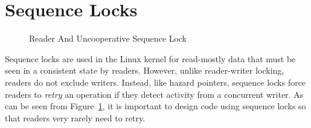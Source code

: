 
\section{Sequence Locks}
\label{sec:defer:Sequence Locks}

\begin{figure}[tb]
\begin{center}
\end{center}
\caption{Reader And Uncooperative Sequence Lock}
\label{fig:defer:Reader And Uncooperative Sequence Lock}
\end{figure}

Sequence locks are used in the Linux kernel for read-mostly data that
must be seen in a consistent state by readers.
However, unlike reader-writer locking, readers do not exclude writers.
Instead, like hazard pointers, sequence locks force readers to
\emph{retry} an operation if they detect activity from a concurrent writer.
As can be seen from
Figure~\ref{fig:defer:Reader And Uncooperative Sequence Lock},
it is important to design code using sequence locks so that readers
very rarely need to retry.

